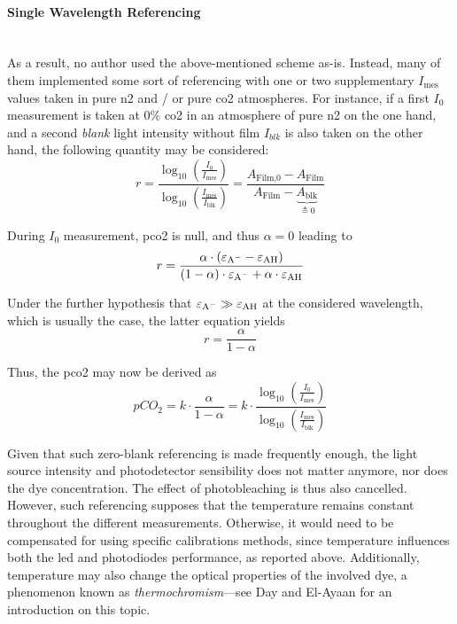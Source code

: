 \paragraph{Single Wavelength Referencing}\mbox{}\\

As a result, no author used the above-mentioned scheme as-is. Instead, many of them\cite{opitz1984, zhujun1984b, wolfbeis1988, he1995, marazuela1995, malins1998, wolfbeis1998, chu2008, chu2009, dansby2010, chu2017} implemented some sort of referencing with one or two supplementary $I_\text{mes}$ values taken in pure \gls{n2} and / or pure \gls{co2} atmospheres. For instance, if a first $I_{0}$ measurement is taken at 0\% \gls{co2} in an atmosphere of pure \gls{n2} on the one hand, and a second \emph{blank} light intensity without film $I_{blk}$ is also taken on the other hand, the following quantity may be considered:
\begin{equation}
	r = \frac{\log_{10}\left(\frac{I_0}{I_\text{mes}}\right)}{\log_{10}\left(\frac{I_\text{mes}}{I_\text{blk}}\right)} = \frac{A_\text{Film,0} - A_\text{Film}}{A_\text{Film} - \underbrace{A_\text{blk}}_{\triangleq 0}}
\end{equation}

During $I_{0}$ measurement, \gls{pco2} is null, and thus $\alpha = 0$ leading to
\begin{equation}
	r = \frac{\alpha \cdot (\ce{\varepsilon_{A^-} - \varepsilon_{AH}})}{(1-\alpha)\cdot \ce{\varepsilon_{A^-} + \alpha\cdot \varepsilon_{AH}}}
\end{equation}

Under the further hypothesis that $\ce{\varepsilon_{A^-}} \gg \ce{\varepsilon_{AH}}$ at the considered wavelength, which is usually the case\cite{segawa2003, mills2009}, the latter equation yields
\begin{equation}
	r = \frac{\alpha}{1-\alpha}
\end{equation}

Thus, the \gls{pco2} may now be derived as
\begin{equation}
	pCO_2 = k \cdot \frac{\alpha}{1-\alpha} = k\cdot \frac{\log_{10}\left(\frac{I_0}{I_\text{mes}}\right)}{\log_{10}\left(\frac{I_\text{mes}}{I_\text{blk}}\right)}
\end{equation}

Given that such zero-blank referencing is made frequently enough, the light source intensity and photodetector sensibility does not matter anymore, nor does the dye concentration. The effect of photobleaching is thus also cancelled. However, such referencing supposes that the temperature remains constant throughout the different measurements. Otherwise, it would need to be compensated for using specific calibrations methods, since temperature influences both the \gls{led} and photodiodes performance, as reported above. Additionally, temperature may also change the optical properties of the involved dye, a phenomenon known as \emph{thermochromism}---see Day and El-Ayaan for an introduction on this topic\cite{day1963, elayaan2001}.

